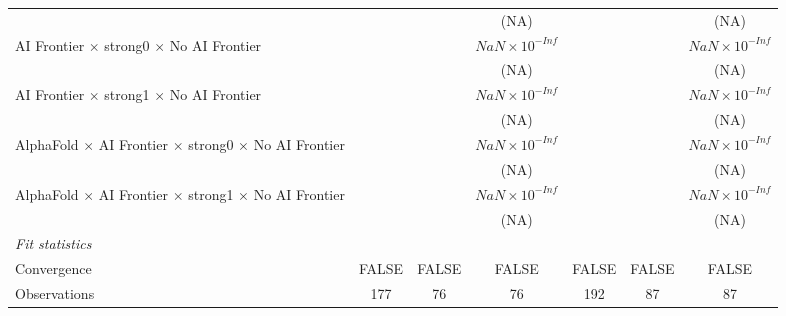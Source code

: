\begin{tabular}{lcccccc}
                                                                              &                        &                        & (NA)                   &       &                        & (NA)\\   
   AI Frontier $\times$ strong0 $\times$ No AI Frontier                       &                        &                        & $NaN\times 10^{-Inf}$  &       &                        & $NaN\times 10^{-Inf}$\\    
                                                                              &                        &                        & (NA)                   &       &                        & (NA)\\   
   AI Frontier $\times$ strong1 $\times$ No AI Frontier                       &                        &                        & $NaN\times 10^{-Inf}$  &       &                        & $NaN\times 10^{-Inf}$\\    
                                                                              &                        &                        & (NA)                   &       &                        & (NA)\\   
   AlphaFold $\times$ AI Frontier $\times$ strong0 $\times$ No AI Frontier    &                        &                        & $NaN\times 10^{-Inf}$  &       &                        & $NaN\times 10^{-Inf}$\\    
                                                                              &                        &                        & (NA)                   &       &                        & (NA)\\   
   AlphaFold $\times$ AI Frontier $\times$ strong1 $\times$ No AI Frontier    &                        &                        & $NaN\times 10^{-Inf}$  &       &                        & $NaN\times 10^{-Inf}$\\    
                                                                              &                        &                        & (NA)                   &       &                        & (NA)\\   
   \midrule
   \emph{Fit statistics}\\
   Convergence                                                                &FALSE                   & FALSE                  & FALSE                  & FALSE & FALSE                  & FALSE\\  
   Observations                                                               & 177                    & 76                     & 76                     & 192   & 87                     & 87\\  

\end{tabular}
